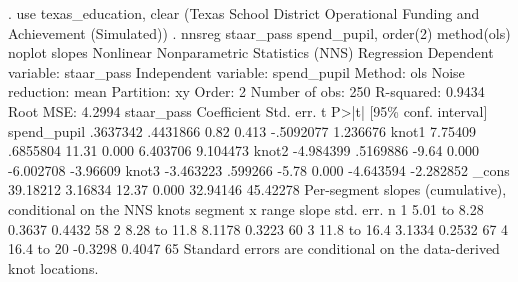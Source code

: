 . use texas_education, clear
(Texas School District Operational Funding and Achievement (Simulated))
{\smallskip}
. nnsreg staar_pass spend_pupil, order(2) method(ols) noplot slopes
{\smallskip}
Nonlinear Nonparametric Statistics (NNS) Regression
Dependent variable:   staar_pass
Independent variable: spend_pupil
Method:               ols
Noise reduction:      mean
Partition:            xy
Order:                2
Number of obs:        250
R-squared:            0.9434
Root MSE:             4.2994
{\smallskip}
  staar_pass {\VBAR} Coefficient  Std. err.      t    P>|t|     [95\% conf. interval]
 spend_pupil {\VBAR}   .3637342   .4431866     0.82   0.413    -.5092077    1.236676
       knot1 {\VBAR}    7.75409   .6855804    11.31   0.000     6.403706    9.104473
       knot2 {\VBAR}  -4.984399   .5169886    -9.64   0.000    -6.002708    -3.96609
       knot3 {\VBAR}  -3.463223    .599266    -5.78   0.000    -4.643594   -2.282852
       _cons {\VBAR}   39.18212    3.16834    12.37   0.000     32.94146    45.42278
{\smallskip}
Per-segment slopes (cumulative), conditional on the NNS knots
 segment                 x range       slope   std. err.       n
       1        5.01 to     8.28      0.3637      0.4432      58
       2        8.28 to     11.8      8.1178      0.3223      60
       3        11.8 to     16.4      3.1334      0.2532      67
       4        16.4 to       20     -0.3298      0.4047      65
Standard errors are conditional on the data-derived knot locations.
